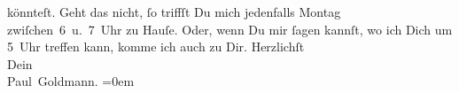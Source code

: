\begin{ledgroupsized}[t]{13cm}
               könnteſt. Geht das nicht, ſo triffſt Du mich jedenfalls Montag{ }zwiſchen 6 u. 7 Uhr{ }zu Hauſe. Oder, wenn Du mir
               ſagen kannſt, wo ich Dich um 5 Uhr treffen kann, komme ich auch zu
               Dir.\pend
           \pstart
           Herzlichſt {\\[\baselineskip]}Dein {\\[\baselineskip]}\spacefill\mbox{Paul Goldmann.}\pend
           \leftskip=0em{}
         
         \endnumbering{}\end{ledgroupsized}  \newcommand{\dateiname}{L03456}\newcommand{\titel}{Paul Goldmann an Arthur Schnitzler, 18. 11. [1904]}\newcommand{\editorInnen}{Martin Anton Müller und Laura Untner}
      